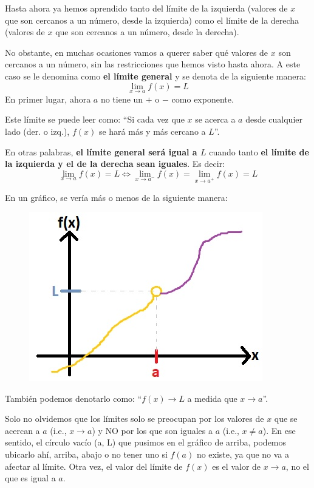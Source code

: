 \documentclass[12pt]{article}
\begin{document}
Hasta ahora ya hemos aprendido tanto del límite de la izquierda (valores de $x$ que son cercanos a un número, desde la izquierda) como el límite de la derecha (valores de $x$ que son cercanos a un número, desde la derecha).

No obstante, en muchas ocasiones vamos a querer saber qué valores de $x$ son cercanos a un número, sin las restricciones que hemos visto hasta ahora. A este caso se le denomina como \textbf{el límite general} y se denota de la siguiente manera:
\[\lim_{x \to a} f(x) = L\]
En primer lugar, ahora $a$ no tiene un $+$ o $-$ como exponente.

Este límite se puede leer como: ``Si cada vez que $x$ se acerca a $a$ desde cualquier lado (der. o izq.), $f(x)$ se hará más y más cercano a $L$''.

En otras palabras, \textbf{el límite general será igual a $L$} cuando tanto \textbf{el límite de la izquierda y el de la derecha sean iguales}. Es decir:
\[\lim_{x \to a} f(x) = L \iff \lim_{x \to a^{-}} f(x) = \lim_{x \to a^{+}} f(x) = L\]

En un gráfico, se vería más o menos de la siguiente manera:

\begin{figure}[hbt]
\centering
\includegraphics[scale=0.7]{img/overall_limit.jpg}
\end{figure}

También podemos denotarlo como: ``$f(x) \to L$ a medida que $x \to a$''.

Solo no olvidemos que los límites solo se preocupan por los valores de $x$ que se acercan a $a$ (i.e., $x \to a$) y NO por los que son iguales a $a$ (i.e., $x \neq a$). En ese sentido, el círculo vacío (a, L) que pusimos en el gráfico de arriba, podemos ubicarlo ahí, arriba, abajo o no tener uno si $f(a)$ no existe, ya que no va a afectar al límite. Otra vez, el valor del límite de $f(x)$ es el valor de $x \to a$, no el que es igual a $a$.
\end{document}
